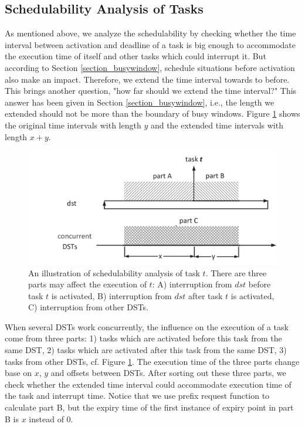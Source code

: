 \documentclass[10pt,conference]{IEEEtran}
\begin{document}
\subsection{Schedulability Analysis of Tasks}
As mentioned above, we analyze the schedulability by checking whether the time interval between activation and deadline of a task is big enough to accommodate the execution time of itself and other tasks which could interrupt it. But according to Section \ref{section_busywindow}, schedule situations before activation also make an impact. Therefore, we extend the time interval towards to before. This brings another question, "how far should we extend the time interval?" This answer has been given in Section \ref{section_busywindow}, i.e., the length we extended should not be more than the boundary of busy windows. Figure \ref{figure_3parts} shows the original time intervals with length $y$ and the extended time intervals with length $x+y$.
\begin{figure}
  \centering
  \includegraphics[scale=0.39]{graphics/figure_3parts-eps-converted-to.pdf}
  \caption{An illustration of schedulability analysis of task $t$. There are three parts may affect the execution of $t$: A) interruption from $dst$ before task $t$ is activated, B) interruption from $dst$ after task $t$ is activated, C) interruption from other DSTs.}
  \label{figure_3parts}
\end{figure}

When several DSTs work concurrently, the influence on the execution of a task come from three parts: 1) tasks which are activated before this task from the same DST, 2) tasks which are activated after this task from the same DST, 3) tasks from other DSTs, cf. Figure \ref{figure_3parts}. The execution time of the three parts change base on $x$, $y$ and offsets between DSTs. After sorting out these three parts, we check whether the extended time interval could accommodate execution time of the task and interrupt time. Notice that we use prefix request function to calculate part B, but the expiry time of the first instance of expiry point in part B is $x$ instead of 0.
\end{document}
